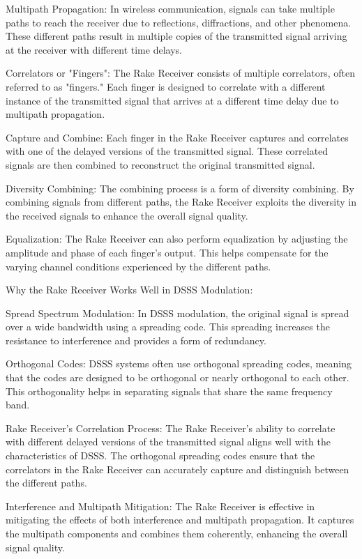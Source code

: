 Multipath Propagation:
In wireless communication, signals can take multiple paths to reach the receiver due to reflections, diffractions, and other phenomena. These different paths result in multiple copies of the transmitted signal arriving at the receiver with different time delays.

Correlators or "Fingers":
The Rake Receiver consists of multiple correlators, often referred to as "fingers." Each finger is designed to correlate with a different instance of the transmitted signal that arrives at a different time delay due to multipath propagation.

Capture and Combine:
Each finger in the Rake Receiver captures and correlates with one of the delayed versions of the transmitted signal. These correlated signals are then combined to reconstruct the original transmitted signal.

Diversity Combining:
The combining process is a form of diversity combining. By combining signals from different paths, the Rake Receiver exploits the diversity in the received signals to enhance the overall signal quality.

Equalization:
The Rake Receiver can also perform equalization by adjusting the amplitude and phase of each finger's output. This helps compensate for the varying channel conditions experienced by the different paths.

Why the Rake Receiver Works Well in DSSS Modulation:

Spread Spectrum Modulation:
In DSSS modulation, the original signal is spread over a wide bandwidth using a spreading code. This spreading increases the resistance to interference and provides a form of redundancy.

Orthogonal Codes:
DSSS systems often use orthogonal spreading codes, meaning that the codes are designed to be orthogonal or nearly orthogonal to each other. This orthogonality helps in separating signals that share the same frequency band.

Rake Receiver's Correlation Process:
The Rake Receiver's ability to correlate with different delayed versions of the transmitted signal aligns well with the characteristics of DSSS. The orthogonal spreading codes ensure that the correlators in the Rake Receiver can accurately capture and distinguish between the different paths.

Interference and Multipath Mitigation:
The Rake Receiver is effective in mitigating the effects of both interference and multipath propagation. It captures the multipath components and combines them coherently, enhancing the overall signal quality.

